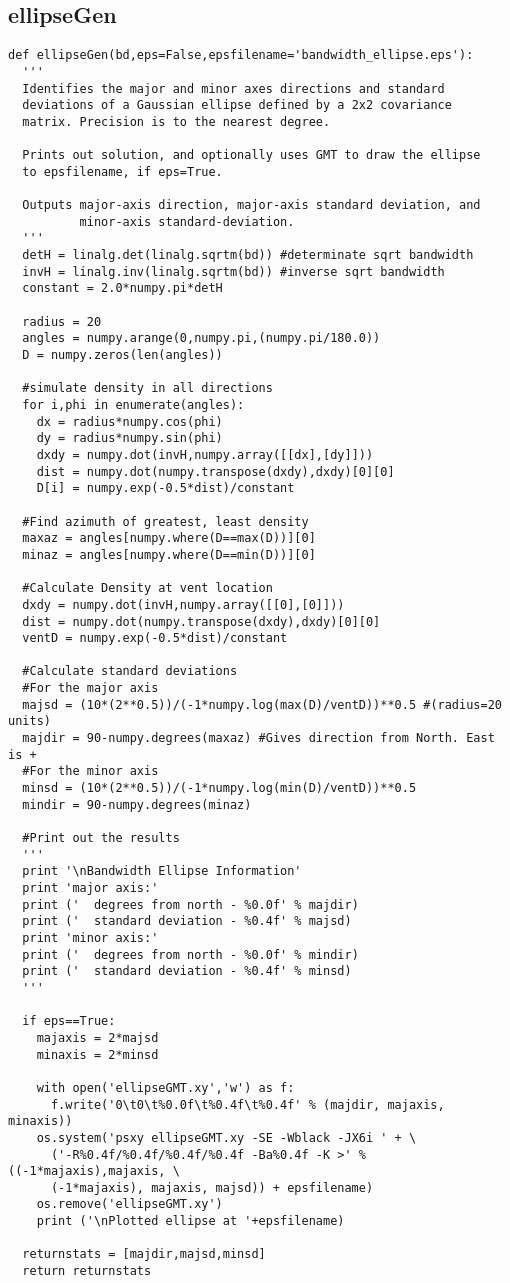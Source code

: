 \documentclass[12pt,letter]{article}
\begin{document}
\subsection{ellipseGen}
\begin{verbatim}
def ellipseGen(bd,eps=False,epsfilename='bandwidth_ellipse.eps'):
  '''
  Identifies the major and minor axes directions and standard
  deviations of a Gaussian ellipse defined by a 2x2 covariance
  matrix. Precision is to the nearest degree.
  
  Prints out solution, and optionally uses GMT to draw the ellipse
  to epsfilename, if eps=True.
  
  Outputs major-axis direction, major-axis standard deviation, and
          minor-axis standard-deviation.
  '''
  detH = linalg.det(linalg.sqrtm(bd)) #determinate sqrt bandwidth
  invH = linalg.inv(linalg.sqrtm(bd)) #inverse sqrt bandwidth
  constant = 2.0*numpy.pi*detH
  
  radius = 20
  angles = numpy.arange(0,numpy.pi,(numpy.pi/180.0))
  D = numpy.zeros(len(angles))
  
  #simulate density in all directions
  for i,phi in enumerate(angles):
    dx = radius*numpy.cos(phi)
    dy = radius*numpy.sin(phi)
    dxdy = numpy.dot(invH,numpy.array([[dx],[dy]]))
    dist = numpy.dot(numpy.transpose(dxdy),dxdy)[0][0]
    D[i] = numpy.exp(-0.5*dist)/constant
  
  #Find azimuth of greatest, least density
  maxaz = angles[numpy.where(D==max(D))][0]
  minaz = angles[numpy.where(D==min(D))][0]
  
  #Calculate Density at vent location
  dxdy = numpy.dot(invH,numpy.array([[0],[0]]))
  dist = numpy.dot(numpy.transpose(dxdy),dxdy)[0][0]
  ventD = numpy.exp(-0.5*dist)/constant
  
  #Calculate standard deviations
  #For the major axis
  majsd = (10*(2**0.5))/(-1*numpy.log(max(D)/ventD))**0.5 #(radius=20 units)
  majdir = 90-numpy.degrees(maxaz) #Gives direction from North. East is +
  #For the minor axis
  minsd = (10*(2**0.5))/(-1*numpy.log(min(D)/ventD))**0.5
  mindir = 90-numpy.degrees(minaz)

  #Print out the results
  '''
  print '\nBandwidth Ellipse Information'
  print 'major axis:'
  print ('  degrees from north - %0.0f' % majdir)
  print ('  standard deviation - %0.4f' % majsd)
  print 'minor axis:'
  print ('  degrees from north - %0.0f' % mindir)
  print ('  standard deviation - %0.4f' % minsd)
  '''
  
  if eps==True:
    majaxis = 2*majsd
    minaxis = 2*minsd
    
    with open('ellipseGMT.xy','w') as f:
      f.write('0\t0\t%0.0f\t%0.4f\t%0.4f' % (majdir, majaxis, minaxis))
    os.system('psxy ellipseGMT.xy -SE -Wblack -JX6i ' + \ 
      ('-R%0.4f/%0.4f/%0.4f/%0.4f -Ba%0.4f -K >' % ((-1*majaxis),majaxis, \
      (-1*majaxis), majaxis, majsd)) + epsfilename)
    os.remove('ellipseGMT.xy')      
    print ('\nPlotted ellipse at '+epsfilename)
    
  returnstats = [majdir,majsd,minsd]
  return returnstats
\end{verbatim}
\end{document}
